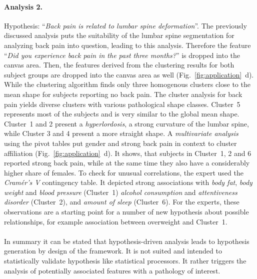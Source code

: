 \documentclass[journal]{style/vgtc} 			          %
\begin{document}
\paragraph{Analysis 2.}
Hypothesis: ``\emph{Back pain is related to lumbar spine deformation}''.
%
The previously discussed analysis puts the suitability of the lumbar spine segmentation for analyzing back pain into question, leading to this analysis.
%
Therefore the feature ``\emph{Did you experience back pain in the past three months?}'' is dropped into the canvas area. %
%
Then, the features derived from the clustering results for both subject groups are dropped into the canvas area as well (Fig.~\ref{fig:application}~d).
%
While the clustering algorithm finds only three homogenous clusters close to the mean shape for subjects reporting no back pain.
%
The cluster analysis for back pain yields diverse clusters with various pathological shape classes.
%
Cluster~5 represents most of the subjects and is very similar to the global mean shape.
%
Cluster~1 and 2 present a \emph{hyperlordosis}, a strong curvature of the lumbar spine, while Cluster 3 and 4 present a more straight shape.
%
A \emph{multivariate analysis} using the pivot tables put gender and strong back pain in context to cluster affiliation (Fig.~\ref{fig:application}~d). 
%
It shows, that subjects in Cluster~1, 2 and 6 reported strong back pain, while at the same time they also have a considerably higher share of females.
%
To check for unusual correlations, the expert used the \emph{Cram\'{e}r's V} contingency table.
%
It depicted strong associations with \emph{body fat}, \emph{body weight} and \emph{blood pressure} (Cluster~1) \emph{alcohol consumption} and \emph{attentiveness disorder} (Cluster~2), and \emph{amount of sleep} (Cluster~6).
%
For the experts, these observations are a starting point for a number of new hypothesis about possible relationships, for example association between overweight and Cluster~1.
%
\\\\
In summary it can be stated that hypothesis-driven analysis leads to hypothesis generation by design of the framework.
%
It is not suited and intended to statistically validate hypothesis like statistical processors.
%
It rather triggers the analysis of potentially associated features with a pathology of interest.
%
\end{document}
